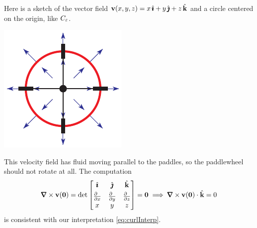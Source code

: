 \begin{eg}\label{eg:curlInterpA}
Here is a sketch of the vector field $\mathbf{v}(x,y,z) = x\,\hat{\pmb{\imath}}+y\,\hat{\pmb{\jmath}}+z\,\hat{\mathbf{k}}$
and a circle centered on the origin, like $C_\varepsilon$. 
\begin{nfig}
\begin{center}
    \includegraphics{sourceCurl.pdf}
\end{center}
\end{nfig}
This velocity field has fluid moving parallel to the paddles,
so the paddlewheel should not rotate at all. The computation
\begin{align*}
\vnabla\times\vv(\vZero) =
\det\left[\begin{matrix}
          \hi & \hj &\hk \\[0.05in]
          \frac{\partial\hfill}{\partial x} &
              \frac{\partial\hfill}{\partial y} &
              \frac{\partial\hfill}{\partial z}  \\
           x & y & z
          \end{matrix}
     \right] 
=\vZero
\implies \vnabla\times\vv(\vZero)\cdot\hk = 0
\end{align*}
is consistent with our interpretation \eqref{eq:curlInterp}.
\end{eg}


